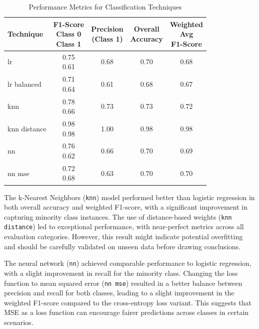 		
	\begin{table}[H]
		\centering
		\begin{tabular}{|l|c|c|c|c|}
			\hline
			\textbf{Technique} & 
			\makecell{F1-Score \\Class 0\\Class 1} & 
			\makecell{Precision \\ (Class 1)} & 
			\makecell{Overall\\Accuracy} & 
			\makecell{Weighted\\Avg\\F1-Score} \\ \hline
			lr & \makecell { 0.75 \\ 0.61 } & 0.68 & 0.70 & 0.68 \\ \hline
			lr balanced & \makecell { 0.71 \\ 0.64 } & 0.61 & 0.68 & 0.67 \\ \hline
			knn & \makecell { 0.78 \\ 0.66 } & 0.73 & 0.73 & 0.72 \\ \hline
			knn distance & \makecell { 0.98 \\ 0.98 } & 1.00 & 0.98 & 0.98 \\ \hline
			nn & \makecell { 0.76 \\ 0.62 } & 0.66 & 0.70 & 0.69 \\ \hline
			nn mse& \makecell { 0.72 \\ 0.68 } & 0.63 & 0.70 & 0.70 \\ \hline
		\end{tabular}
		\caption{Performance Metrics for Classification Techniques}
		\label{tab:metrics}
	\end{table}
	
	
	
	The k-Nearest Neighbors (\texttt{knn}) model performed better than logistic regression in both overall accuracy and weighted F1-score, with a significant improvement in capturing minority class instances. The use of distance-based weights (\texttt{knn distance}) led to exceptional performance, with near-perfect metrics across all evaluation categories. However, this result might indicate potential overfitting and should be carefully validated on unseen data before drawing conclusions.
	
	The neural network (\texttt{nn}) achieved comparable performance to logistic regression, with a slight improvement in recall for the minority class. Changing the loss function to mean squared error (\texttt{nn mse}) resulted in a better balance between precision and recall for both classes, leading to a slight improvement in the weighted F1-score compared to the cross-entropy loss variant. This suggests that MSE as a loss function can encourage fairer predictions across classes in certain scenarios.
	
